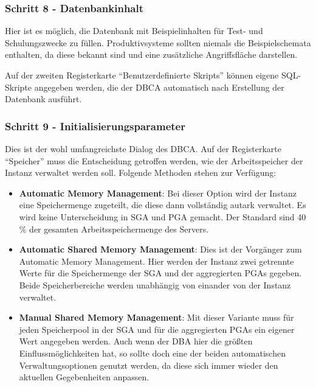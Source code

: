         \subsubsection{Schritt 8 - Datenbankinhalt}
          Hier ist es m\"oglich, die Datenbank mit Beispielinhalten f\"ur Test-
          und Schulungszwecke zu f\"ullen. Produktivsysteme sollten niemals die
          Beispielschemata enthalten, da diese bekannt sind und eine
          zus\"atzliche Angriffsfl\"ache darstellen.

          Auf der zweiten Registerkarte \enquote{Benutzerdefinierte Skripts}
          k\"onnen eigene SQL-Skripte angegeben werden, die der DBCA automatisch
          nach Erstellung der Datenbank ausf\"uhrt.
        \subsubsection{Schritt 9 - Initialisierungsparameter}
          Dies ist der wohl umfangreichste Dialog des DBCA. Auf der
          Registerkarte \enquote{Speicher} muss die Entscheidung getroffen
          werden, wie der Arbeitsspeicher der Instanz verwaltet werden soll.
          Folgende Methoden stehen zur Verf\"ugung:
          \begin{itemize}
            \item \textbf{Automatic Memory Management}: Bei dieser Option wird der Instanz eine Speichermenge zugeteilt, die diese dann vollst\"andig autark verwaltet. Es wird keine Unterscheidung in SGA und PGA gemacht. Der Standard sind 40 \% der gesamten Arbeitsspeichermenge des Servers.
            \item \textbf{Automatic Shared Memory Management}: Dies ist der Vorg\"anger zum Automatic Memory Management. Hier werden der Instanz zwei getrennte Werte f\"ur die Speichermenge der SGA und der aggregierten PGAs gegeben. Beide Speicherbereiche werden unabh\"angig von einander von der Instanz verwaltet.
\clearpage
            \item \textbf{Manual Shared Memory Management}: Mit dieser Variante
            muss f\"ur jeden Speicherpool in der SGA und f\"ur die aggregierten
            PGAs ein eigener Wert angegeben werden. Auch wenn der DBA hier die
            gr\"o\ss{}ten Einflussm\"oglichkeiten hat, so sollte doch eine der
            beiden automatischen Verwaltungsoptionen genutzt werden, da diese
            sich immer wieder den aktuellen Gegebenheiten anpassen.
          \end{itemize}
